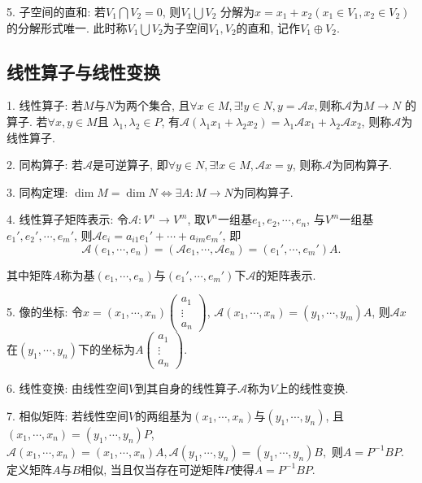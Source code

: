 5. 子空间的直和: 若$V_1 \bigcap V_2 = 0$, 则$V_1 \bigcup V_2$ 分解为$x=x_1+x_2 (x_1 \in V_1, x_2 \in V_2)$的分解形式唯一. 
此时称$V_1 \bigcup V_2$为子空间$V_1,V_2$的直和, 记作$V_1 \oplus V_2$.

\subsection{线性算子与线性变换}

1. 线性算子: 若$M$与$N$为两个集合, 且$\forall x \in M, \exists ! y \in N, y=\mathscr{A}x, $则称$\mathscr{A}$为$M\rightarrow N$ 的算子. 
若$\forall x,y \in M$且 $\lambda_1,\lambda_2 \in P$, 有$\mathscr{A}(\lambda_1 x_1 +\lambda_2 x_2)=\lambda_1 \mathscr{A}x_1+\lambda_2 \mathscr{A} x_2$, 则称$\mathscr{A}$为线性算子.

2. 同构算子: 若$\mathscr{A}$是可逆算子, 即$\forall y \in N , \exists ! x\in M,\mathscr{A}x=y$, 则称$\mathscr{A}$为同构算子.

3. 同构定理: $\dim M=\dim N \Leftrightarrow \exists A:M\rightarrow N$为同构算子.

4. 线性算子矩阵表示: 令$\mathscr{A}: V^n \rightarrow V^m$, 取$V^n$一组基$e_1,e_2,\cdots,e_n$, 
与$V^m$一组基$e_1',e_2',\cdots,e_m'$, 则$\mathscr{A} e_i=a_{i1}e_1'+\cdots+a_{im}e_m'$, 即
\begin{equation*}
\mathscr{A}(e_1,\cdots,e_n)=(\mathscr{A} e_1,\cdots,\mathscr{A} e_n)=(e_1',\cdots,e_m')A.
\end{equation*}

其中矩阵$A$称为基$(e_1,\cdots,e_n)$与$(e_1',\cdots,e_m')$下$\mathscr{A}$的矩阵表示.

5. 像的坐标: 令$x=(x_1,\cdots,x_n)\begin{pmatrix}
    a_1\\
    \vdots\\
    a_n
\end{pmatrix}$, $\mathscr{A}(x_1,\cdots,x_n)=(y_1,\cdots,y_m)A$, 
则$\mathscr{A} x$在$(y_1,\cdots,y_n)$下的坐标为$A\begin{pmatrix}
a_1\\
\vdots\\
a_n
\end{pmatrix}$.

6. 线性变换: 由线性空间$V$到其自身的线性算子$\mathscr{A}$称为$V$上的线性变换.

7. 相似矩阵: 若线性空间$V$的两组基为$(x_1,\cdots,x_n)$与$(y_1,\cdots,y_n)$, 且$(x_1,\cdots,x_n)=(y_1,\cdots,y_n)P$, 
$\mathscr{A}(x_1,\cdots,x_n)=(x_1,\cdots,x_n)A, \mathscr{A}(y_1,\cdots,y_n)=(y_1,\cdots,y_n)B,$ 则$A=P^{-1}BP$. 
定义矩阵$A$与$B$相似, 当且仅当存在可逆矩阵$P$使得$A=P^{-1}BP$.
  

